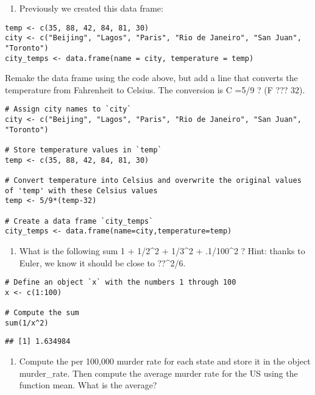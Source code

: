 \documentclass[
]{article}
\providecommand{\tightlist}{%
  \setlength{\itemsep}{0pt}\setlength{\parskip}{0pt}}
\begin{document}
\begin{enumerate}
\def\labelenumi{\arabic{enumi}.}
\tightlist
\item
  Previously we created this data frame:
\end{enumerate}

\begin{verbatim}
temp <- c(35, 88, 42, 84, 81, 30)
city <- c("Beijing", "Lagos", "Paris", "Rio de Janeiro", "San Juan", "Toronto")
city_temps <- data.frame(name = city, temperature = temp)
\end{verbatim}

Remake the data frame using the code above, but add a line that converts
the temperature from Fahrenheit to Celsius. The conversion is C =5/9 ?
(F ??? 32).

\begin{verbatim}
# Assign city names to `city` 
city <- c("Beijing", "Lagos", "Paris", "Rio de Janeiro", "San Juan", "Toronto")

# Store temperature values in `temp`
temp <- c(35, 88, 42, 84, 81, 30)

# Convert temperature into Celsius and overwrite the original values of 'temp' with these Celsius values
temp <- 5/9*(temp-32)

# Create a data frame `city_temps` 
city_temps <- data.frame(name=city,temperature=temp)
\end{verbatim}

\begin{enumerate}
\def\labelenumi{\arabic{enumi}.}
\setcounter{enumi}{1}
\tightlist
\item
  What is the following sum 1 + 1/2\^{}2 + 1/3\^{}2 + .1/100\^{}2 ?
  Hint: thanks to Euler, we know it should be close to ??\^{}2/6.
\end{enumerate}

\begin{verbatim}
# Define an object `x` with the numbers 1 through 100
x <- c(1:100)

# Compute the sum 
sum(1/x^2)
\end{verbatim}

\begin{verbatim}
## [1] 1.634984
\end{verbatim}

\begin{enumerate}
\def\labelenumi{\arabic{enumi}.}
\setcounter{enumi}{2}
\tightlist
\item
  Compute the per 100,000 murder rate for each state and store it in the
  object murder\_rate. Then compute the average murder rate for the US
  using the function mean. What is the average?
\end{enumerate}
\end{document}
